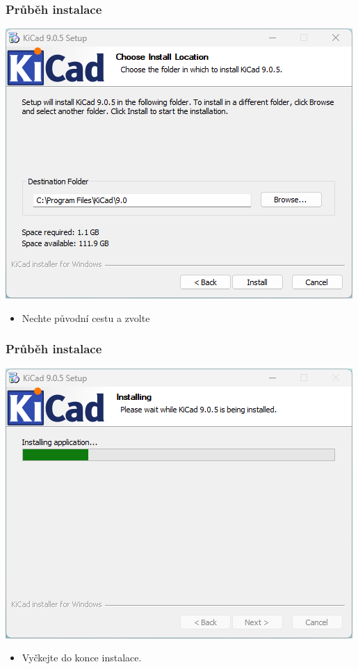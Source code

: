 \documentclass{beamer}
\begin{document}
	\begin{frame}
    \frametitle{Průběh instalace}
		\begin{center}
			\includegraphics[scale=0.5]{obr/kicad_inst4.png}
		\end{center}
		
		\begin{itemize}
			\item Nechte původní cestu a zvolte 
		\end{itemize}
	\end{frame}
	\begin{frame}
    \frametitle{Průběh instalace}
		\begin{center}
			\includegraphics[scale=0.5]{obr/kicad_inst5.png}
		\end{center}
		
		\begin{itemize}
			\item Vyčkejte do konce instalace.
		\end{itemize}
	\end{frame}
\end{document}
